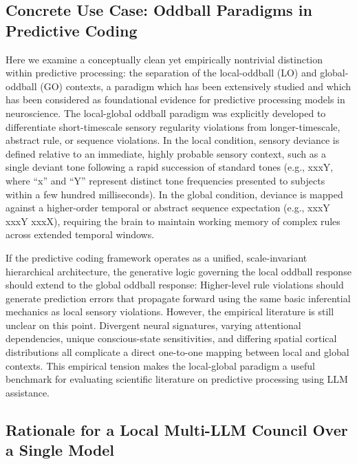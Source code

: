\documentclass[12pt]{article}
\begin{document}
\subsection{Concrete Use Case: Oddball Paradigms in Predictive Coding}\label{concrete-use-case-oddball-paradigms-in-predictive-coding}

Here we examine a conceptually clean yet empirically nontrivial distinction within predictive processing: the separation of the local-oddball (LO) and global-oddball (GO) contexts, a paradigm which has been extensively studied and which has been considered as foundational evidence for predictive processing models in neuroscience\cite{ref49}. The local-global oddball paradigm was explicitly developed to differentiate short-timescale sensory regularity violations from longer-timescale, abstract rule, or sequence violations\cite{ref29}. In the local condition, sensory deviance is defined relative to an immediate, highly probable sensory context, such as a single deviant tone following a rapid succession of standard tones (e.g., xxxY, where ``x'' and ``Y'' represent distinct tone frequencies presented to subjects within a few hundred milliseconds). In the global condition, deviance is mapped against a higher-order temporal or abstract sequence expectation (e.g., xxxY xxxY xxxX), requiring the brain to maintain working memory of complex rules across extended temporal windows.

If the predictive coding framework operates as a unified, scale-invariant hierarchical architecture, the generative logic governing the local oddball response should extend to the global oddball response: Higher-level rule violations should generate prediction errors that propagate forward using the same basic inferential mechanics as local sensory violations\cite{ref49}. However, the empirical literature is still unclear on this point\cite{ref33,ref34,ref49,ref50}. Divergent neural signatures\cite{ref34}, varying attentional dependencies\cite{ref29}, unique conscious-state sensitivities\cite{ref33,ref51}, and differing spatial cortical distributions\cite{ref29,ref34,ref52} all complicate a direct one-to-one mapping between local and global contexts. This empirical tension makes the local-global paradigm a useful benchmark for evaluating scientific literature on predictive processing using LLM assistance.

\subsection{Rationale for a Local Multi-LLM Council Over a Single Model}\label{rationale-for-a-local-multi-llm-council-over-a-single-oracle}
\end{document}
